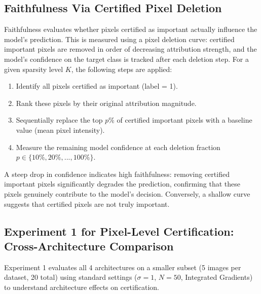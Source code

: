 \documentclass[11pt]{article}
\begin{document}
\subsection{Faithfulness Via Certified Pixel Deletion}

Faithfulness evaluates whether pixels certified as important actually influence the model's prediction. This is measured using a pixel deletion curve: certified important pixels are removed in order of decreasing attribution strength, and the model's confidence on the target class is tracked after each deletion step.
For a given sparsity level $K$, the following steps are applied:
\begin{enumerate}
\item Identify all pixels certified as important (label = 1).
\item Rank these pixels by their original attribution magnitude.
\item Sequentially replace the top $p\%$ of certified important pixels with a baseline value (mean pixel intensity).
\item Measure the remaining model confidence at each deletion fraction $p \in \{10\%, 20\%, ..., 100\%\}$.
\end{enumerate}

A steep drop in confidence indicates high faithfulness: removing certified important pixels significantly degrades the prediction, confirming that these pixels genuinely contribute to the model's decision. Conversely, a shallow curve suggests that certified pixels are not truly important.



\subsection{Experiment 1 for Pixel-Level Certification: Cross-Architecture Comparison}

Experiment 1 evaluates all 4 architectures on a smaller subset (5 images per dataset, 20 total) using standard settings ($\sigma=1$, $N=50$, Integrated Gradients) to understand architecture effects on certification. 
\end{document}
